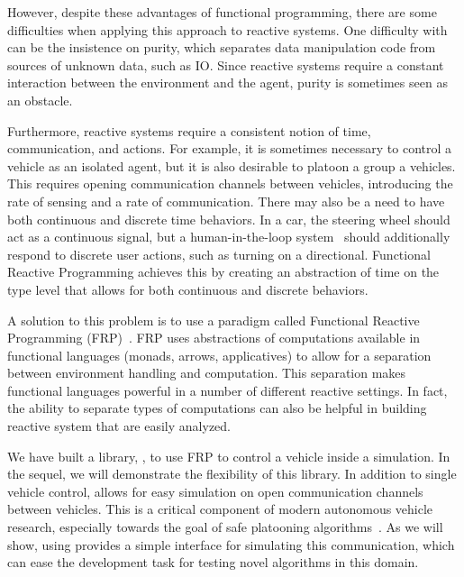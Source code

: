 However, despite these advantages of functional programming, there are some difficulties when applying this approach to reactive systems.
One difficulty with can be the insistence on purity, which separates data manipulation code from sources of unknown data, such as IO.
Since reactive systems require a constant interaction between the environment and the agent, purity is sometimes seen as an obstacle.

Furthermore, reactive systems require a consistent notion of time, communication, and actions.
For example, it is sometimes necessary to control a vehicle as an isolated agent, but it is also desirable to platoon a group a vehicles.
This requires opening communication channels between vehicles, introducing the rate of sensing and a rate of communication.
There may also be a need to have both continuous and discrete time behaviors.
In a car, the steering wheel should act as a continuous signal, but a human-in-the-loop system~\cite{li2014synthesis} should additionally respond to discrete user actions, such as turning on a directional.
Functional Reactive Programming achieves this by creating an abstraction of time on the type level that allows for both continuous and discrete behaviors.

A solution to this problem is to use a paradigm called Functional Reactive Programming (FRP)~\cite{hudak2003arrows,hudak2000haskell}.
FRP uses abstractions of computations available in functional languages (\eg monads, arrows, applicatives) to allow for a separation between environment handling and computation.
This separation makes functional languages powerful in a number of different reactive settings.
In fact, the ability to separate types of computations can also be helpful in building reactive system that are easily analyzed.

We have built a library, \ourLib, to use FRP to control a vehicle inside a simulation.
In the sequel, we will demonstrate the flexibility of this library.
In addition to single vehicle control, \ourLib allows for easy simulation on open communication channels between vehicles.
This is a critical component of modern autonomous vehicle research, especially towards the goal of safe platooning algorithms~\cite{?}.
As we will show, using \ourLib provides a simple interface for simulating this communication, which can ease the development task for testing novel algorithms in this domain.

